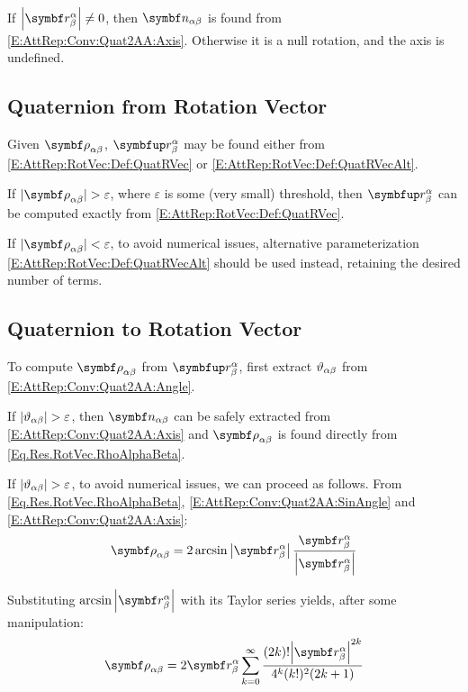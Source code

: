 If $\norm{\imRotQ{\alpha}{\beta}} \neq 0$, then $\vrel{\rotax}{\alpha}{\beta}$ is found from \eqref{E:AttRep:Conv:Quat2AA:Axis}. Otherwise it is a null rotation, and the axis is undefined.

\subsection{Quaternion from Rotation Vector}
Given $\rotv[]{\alpha}{\beta}$, $\RotQ{\alpha}{\beta}$ may be found either from \eqref{E:AttRep:RotVec:Def:QuatRVec} or \eqref{E:AttRep:RotVec:Def:QuatRVecAlt}.

If $|\rotv[]{\alpha}{\beta}| > \varepsilon$, where $\varepsilon$ is some (very small) threshold, then $\RotQ{\alpha}{\beta}$ can be computed exactly from \eqref{E:AttRep:RotVec:Def:QuatRVec}.

If $|\rotv[]{\alpha}{\beta}| < \varepsilon$, to avoid numerical issues, alternative parameterization \eqref{E:AttRep:RotVec:Def:QuatRVecAlt} should be used instead, retaining the desired number of terms.

\subsection{Quaternion to Rotation Vector}
To compute $\rotv[]{\alpha}{\beta}$ from $\RotQ{\alpha}{\beta}$, first extract $\vartheta_{\alpha \beta}$ from \eqref{E:AttRep:Conv:Quat2AA:Angle}.

If $|\vartheta_{\alpha \beta}| > \varepsilon$, then $\vrel{\rotax}{\alpha}{\beta}$ can be safely extracted from \eqref{E:AttRep:Conv:Quat2AA:Axis} and $\rotv[]{\alpha}{\beta}$ is found directly from \eqref{Eq.Res.RotVec.RhoAlphaBeta}.

If $|\vartheta_{\alpha \beta}| > \varepsilon$, to avoid numerical issues, we can proceed as follows. From \eqref{Eq.Res.RotVec.RhoAlphaBeta}, \eqref{E:AttRep:Conv:Quat2AA:SinAngle} and \eqref{E:AttRep:Conv:Quat2AA:Axis}:
\begin{equation*}
	\rotv[]{\alpha}{\beta} = 2 \arcsin \norm{\imRotQ{\alpha}{\beta}} \frac{\imRotQ{\alpha}{\beta}}{\norm{\imRotQ{\alpha}{\beta}}}	
\end{equation*}

Substituting $\arcsin \norm{\imRotQ{\alpha}{\beta}}$ with its Taylor series yields, after some manipulation:
\begin{equation}
	\rotv[]{\alpha}{\beta} = 2 \imRotQ{\alpha}{\beta} \sum^{\infty}_{k=0} {\frac{(2k)! {\norm{\imRotQ{\alpha}{\beta}}}^{2k}}
	{4^k (k!)^2 (2k+1)}}
\end{equation}

